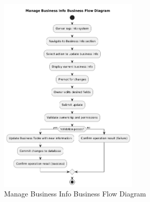 \documentclass[]{VUMIFTemplateClass}
\begin{document}
\begin{figure}[H]
    \centering
    \includegraphics[width=0.6\textwidth]{docs/ps-design/design-document/diagrams/business/bpmn_business_info_manage.png}
    \caption{Manage Business Info Business Flow Diagram}
    \label{fig:business_info_manage_flow}
\end{figure}

\printbibliography[title = {References and sources}]
\end{document}
